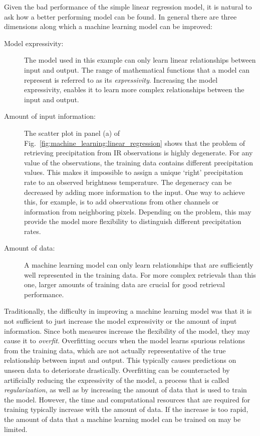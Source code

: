 Given the bad performance of the simple linear regression model, it is natural
to ask how a better performing model can be found. In general there are three
dimensions along which a machine learning model can be improved:
\begin{description}
\item[Model expressivity:] The model used in this example can only learn
  linear relationships between input and output. The range of mathematical functions
  that a model can represent is referred to as its \textit{expressivity}. Increasing
  the model expressivity, enables it to learn  more complex relationships between
  the input and output.
\item[Amount of input information:] The scatter plot in panel (a) of
  Fig.~\ref{fig:machine_learning:linear_regression} shows that the problem of
  retrieving precipitation from IR observations is highly degenerate. For any
  value of the observations, the training data contains different precipitation
  values. This makes it impossible to assign a unique `right' precipitation rate
  to an observed brightness temperature. The degeneracy can be decreased by
  adding more information to the input. One way to achieve this, for example, is
  to add observations from other channels or information from neighboring
  pixels. Depending on the problem, this may provide the model more flexibility
  to distinguish different precipitation rates.
\item[Amount of data:] A machine learning model can only learn relationships
  that are sufficiently well represented in the training data. For more complex
  retrievals than this one, larger amounts of training data are crucial for good
  retrieval performance.
\end{description}

Traditionally, the difficulty in improving a machine learning model was that it
is not sufficient to just increase the model expressivity or the amount of input
information. Since both measures increase the flexibility of the model, they may
cause it to \textit{overfit}. Overfitting occurs when the
model learns spurious relations from the training data, which are not actually
representative of the true relationship between input and output. This typically
causes predictions on unseen data to deteriorate drastically. Overfitting can be
counteracted by artificially reducing the expressivity of the model, a process
that is called \textit{regularization}, as well as by increasing the amount of data
that is used to train the model. However, the time and computational resources
that are required for training typically increase with the amount of data. If
the  increase is too rapid, the amount of data that a machine learning model
can be trained on may be limited.

